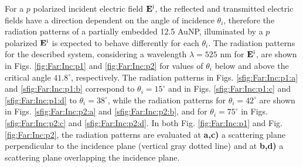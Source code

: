 For a $p$ polarized incident electric field $\vb{E}^\text{i}$, the reflected and transmitted electric fields have a direction dependent on the angle of incidence $\theta_i$, therefore the radiation patterns of a partially embedded  12.5 AuNP, illuminated by a  $p$ polarized  $\vb{E}^\text{i}$ is expected to behave differently for each $\theta_i$. The radiation patterns for the described system, considering a wavelength $\lambda = 525$ nm for $\vb{E}^\text{i}$, are shown in Figs. \ref{fig:Far:Inc:p1} and  \ref{fig:Far:Inc:p2} for values of $\theta_i$ below and above the critical angle $41.8^\circ$, respectively. The radiation patterns in Figs. \ref{sfig:Far:Inc:p1:a} and  \ref{sfig:Far:Inc:p1:b} correspond to $\theta_i = 15^\circ$ and in Figs. \ref{sfig:Far:Inc:p1:c} and  \ref{sfig:Far:Inc:p1:d} to  $\theta_i = 38^\circ$, while the radiation patterns for  $\theta_i = 42^\circ$ are shown in  Figs. \ref{sfig:Far:Inc:p2:a} and  \ref{sfig:Far:Inc:p2:b}, and for $\theta_i = 75^\circ$ in  Figs. \ref{sfig:Far:Inc:p2:c} and  \ref{sfig:Far:Inc:p2:d}. In both Fig. \ref{fig:Far:Inc:p1} and Fig. \ref{fig:Far:Inc:p2}, the radiation patterns are evaluated at \textbf{a,c)}  a scattering plane perpendicular to the incidence plane (vertical gray dotted line) and  at \textbf{b,d)}  a scattering plane overlapping the incidence plane.

